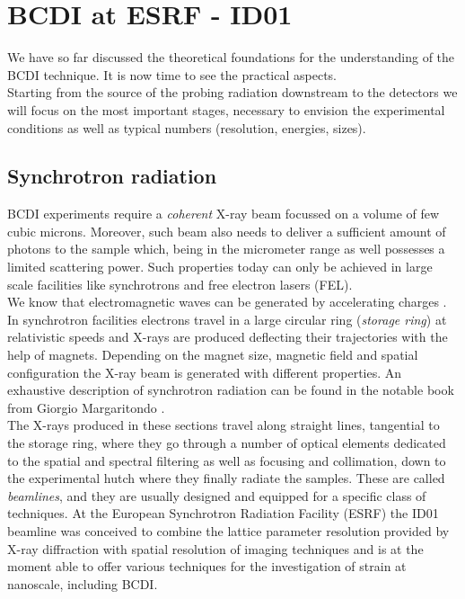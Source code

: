 \section{BCDI at ESRF - ID01}\label{chp:id01}

We have so far discussed the theoretical foundations for the understanding of the BCDI technique. It is now time to 
see the practical aspects. \\
Starting from the source of the probing radiation downstream to the detectors we will focus on the most important stages, 
necessary to envision the experimental conditions as well as typical numbers (resolution, energies, sizes).

\subsection{Synchrotron radiation}

BCDI experiments require a \textit{coherent} X-ray beam focussed on a volume of few cubic microns. Moreover, such beam also needs 
to deliver a sufficient amount of photons to the sample which, being in the micrometer range as well possesses a limited scattering 
power. Such properties today can only be achieved in large scale facilities like synchrotrons and free electron lasers (FEL). \\
We know that electromagnetic waves can be generated by accelerating charges \cite{griffiths}. In synchrotron facilities 
electrons travel in a large circular ring (\textit{storage ring}) at relativistic speeds and X-rays are produced deflecting their trajectories 
with the help of magnets. Depending on the magnet size, magnetic field and spatial configuration the X-ray beam is generated 
with different properties. An exhaustive description of synchrotron radiation can be found in the notable book from Giorgio 
Margaritondo \cite{margaritondo}.\\
The X-rays produced in these sections travel along straight lines, tangential to the storage ring, where they go through 
a number of optical elements dedicated to the spatial and spectral filtering as well as focusing and collimation, down 
to the experimental hutch where they finally radiate the samples. These are called \textit{beamlines}, and they are usually 
designed and equipped for a specific class of techniques. 
At the European Synchrotron Radiation Facility (ESRF) the ID01 beamline was conceived to combine the lattice parameter 
resolution provided by X-ray diffraction with spatial resolution of imaging techniques \cite{leake_nanodiffraction_2019} and 
is at the moment able to offer various techniques for the investigation of strain at nanoscale, including BCDI. 




